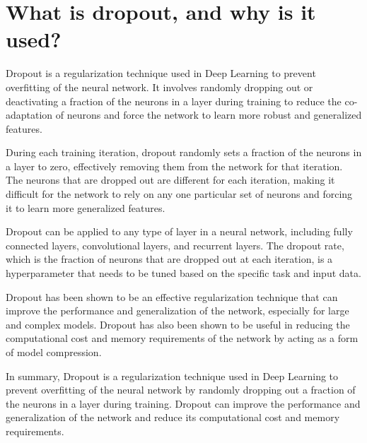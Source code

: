 \section{What is dropout, and why is it used?}
Dropout is a regularization technique used in Deep Learning to prevent overfitting of the neural network. It involves randomly dropping out or deactivating a fraction of the neurons in a layer during training to reduce the co-adaptation of neurons and force the network to learn more robust and generalized features.

During each training iteration, dropout randomly sets a fraction of the neurons in a layer to zero, effectively removing them from the network for that iteration. The neurons that are dropped out are different for each iteration, making it difficult for the network to rely on any one particular set of neurons and forcing it to learn more generalized features.

Dropout can be applied to any type of layer in a neural network, including fully connected layers, convolutional layers, and recurrent layers. The dropout rate, which is the fraction of neurons that are dropped out at each iteration, is a hyperparameter that needs to be tuned based on the specific task and input data.

Dropout has been shown to be an effective regularization technique that can improve the performance and generalization of the network, especially for large and complex models. Dropout has also been shown to be useful in reducing the computational cost and memory requirements of the network by acting as a form of model compression.

In summary, Dropout is a regularization technique used in Deep Learning to prevent overfitting of the neural network by randomly dropping out a fraction of the neurons in a layer during training. Dropout can improve the performance and generalization of the network and reduce its computational cost and memory requirements.

